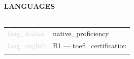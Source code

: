 \documentclass{article}
\begin{document}
\textbf{\textcolor{deepblue}{\uppercase{{{languages}}}}} \\\\ \hfill
\begin{tabular}{ R{4cm} L{11cm} }
	\textcolor{lightgray}{{{lang_italian}}} & {{native_proficiency}} \\ \hfill
	\textcolor{lightgray}{{{lang_english}}} & B1 — {{toefl_certification}}\\ \hfill
\end{tabular}
\end{document}
